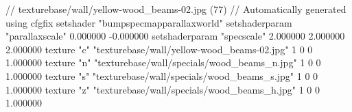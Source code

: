 // texturebase/wall/yellow-wood_beams-02.jpg (77)
// Automatically generated using cfgfix
setshader "bumpspecmapparallaxworld"
setshaderparam "parallaxscale" 0.000000 -0.000000
setshaderparam "specscale" 2.000000 2.000000 2.000000
texture "c" "texturebase/wall/yellow-wood_beams-02.jpg" 1 0 0 1.000000
texture "n" "texturebase/wall/specials/wood_beams_n.jpg" 1 0 0 1.000000
texture "s" "texturebase/wall/specials/wood_beams_s.jpg" 1 0 0 1.000000
texture "z" "texturebase/wall/specials/wood_beams_h.jpg" 1 0 0 1.000000
